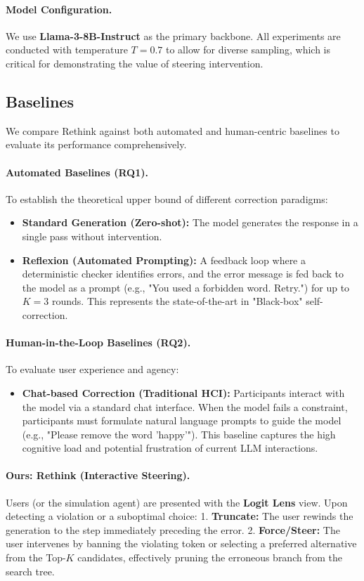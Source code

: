 \documentclass{article}
\begin{document}
\paragraph{Model Configuration.}
We use \textbf{Llama-3-8B-Instruct} as the primary backbone. All experiments are conducted with temperature $T=0.7$ to allow for diverse sampling, which is critical for demonstrating the value of steering intervention.

\subsection{Baselines}
We compare Rethink against both automated and human-centric baselines to evaluate its performance comprehensively.

\paragraph{Automated Baselines (RQ1).}
To establish the theoretical upper bound of different correction paradigms:
\begin{itemize}
    \item \textbf{Standard Generation (Zero-shot):} The model generates the response in a single pass without intervention.
    \item \textbf{Reflexion (Automated Prompting):} A feedback loop where a deterministic checker identifies errors, and the error message is fed back to the model as a prompt (e.g., "You used a forbidden word. Retry.") for up to $K=3$ rounds. This represents the state-of-the-art in "Black-box" self-correction.
\end{itemize}

\paragraph{Human-in-the-Loop Baselines (RQ2).}
To evaluate user experience and agency:
\begin{itemize}
    \item \textbf{Chat-based Correction (Traditional HCI):} Participants interact with the model via a standard chat interface. When the model fails a constraint, participants must formulate natural language prompts to guide the model (e.g., "Please remove the word 'happy'"). This baseline captures the high cognitive load and potential frustration of current LLM interactions.
\end{itemize}

\paragraph{Ours: Rethink (Interactive Steering).}
Users (or the simulation agent) are presented with the \textbf{Logit Lens} view. Upon detecting a violation or a suboptimal choice:
1.  \textbf{Truncate:} The user rewinds the generation to the step immediately preceding the error.
2.  \textbf{Force/Steer:} The user intervenes by banning the violating token or selecting a preferred alternative from the Top-$K$ candidates, effectively pruning the erroneous branch from the search tree.
\end{document}
